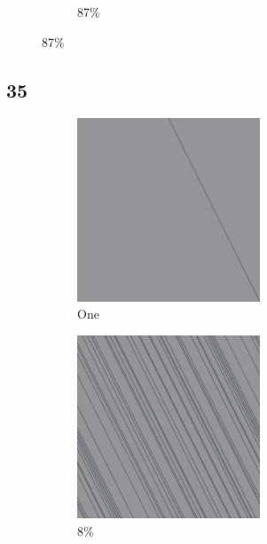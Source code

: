 \documentclass[12pt, fleqn]{report}                             %
\theoremstyle{break}                                            %
\begin{document}
\begin{figure}[ht!]
\begin{subfigure}[b]{0.4\linewidth}
          \caption{87\%}
        \end{subfigure}
      \end{figure}


      \clearpage
      \subsection{35}
      \begin{figure}[ht!]
        \centering
        \begin{subfigure}[b]{0.4\linewidth}
          \includegraphics[width=0.6\textwidth]{Images/35/a.png}
          \caption{One}
        \end{subfigure}
        \begin{subfigure}[b]{0.4\linewidth}
          \includegraphics[width=0.6\textwidth]{Images/35/b.png}
          \caption{8\%}
        \end{subfigure}
        \begin{subfigure}[b]{0.4\linewidth}

\end{subfigure}
\end{figure}
\end{document}
